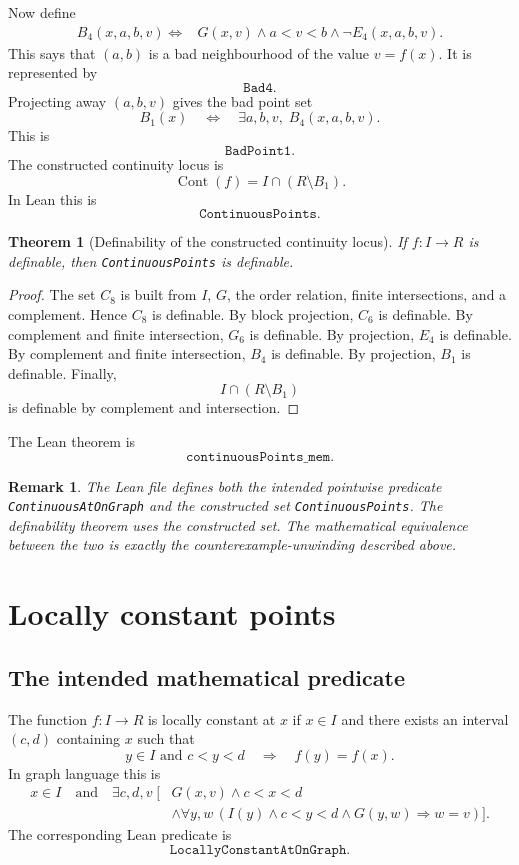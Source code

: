 \documentclass[11pt]{article}
\newtheorem{theorem}[definition]{Theorem}
\newtheorem{remark}[definition]{Remark}
\newcommand{\Cont}{\operatorname{Cont}}
\newcommand{\Lean}[1]{\texttt{#1}}
\begin{document}
Now define
\[
\begin{aligned}
  B_4(x,a,b,v)
  \Longleftrightarrow{}&
  G(x,v)
  \land a<v<b
  \land \neg E_4(x,a,b,v).
\end{aligned}
\]
This says that $(a,b)$ is a bad neighbourhood of the value $v=f(x)$.  It is represented by
\[
  \Lean{Bad4}.
\]
Projecting away $(a,b,v)$ gives the bad point set
\[
  B_1(x)
  \quad\Longleftrightarrow\quad
  \exists a,b,v,
  \;B_4(x,a,b,v).
\]
This is
\[
  \Lean{BadPoint1}.
\]
The constructed continuity locus is
\[
  \Cont(f)=I\cap (R\setminus B_1).
\]
In Lean this is
\[
  \Lean{ContinuousPoints}.
\]

\begin{theorem}[Definability of the constructed continuity locus]
If $f:I\to R$ is definable, then \Lean{ContinuousPoints} is definable.
\end{theorem}

\begin{proof}
The set $C_8$ is built from $I$, $G$, the order relation, finite intersections, and a complement.
Hence $C_8$ is definable.  By block projection, $C_6$ is definable.  By complement and finite
intersection, $G_6$ is definable.  By projection, $E_4$ is definable.  By complement and finite
intersection, $B_4$ is definable.  By projection, $B_1$ is definable.  Finally,
\[
  I\cap(R\setminus B_1)
\]
is definable by complement and intersection.
\end{proof}

The Lean theorem is
\[
  \Lean{continuousPoints\_mem}.
\]

\begin{remark}
The Lean file defines both the intended pointwise predicate \Lean{ContinuousAtOnGraph} and the
constructed set \Lean{ContinuousPoints}.  The definability theorem uses the constructed set.  The
mathematical equivalence between the two is exactly the counterexample-unwinding described above.
\end{remark}

\section{Locally constant points}

\subsection{The intended mathematical predicate}

The function $f:I\to R$ is locally constant at $x$ if $x\in I$ and there exists an interval $(c,d)$
containing $x$ such that
\[
  y\in I\text{ and }c<y<d
  \quad\Longrightarrow\quad
  f(y)=f(x).
\]
In graph language this is
\[
\begin{aligned}
  x\in I
  \quad\text{and}\quad
  \exists c,d,v\;[&G(x,v)
  \land c<x<d\\
  &\land
  \forall y,w\,(I(y)\land c<y<d\land G(y,w)
  \Rightarrow w=v)].
\end{aligned}
\]
The corresponding Lean predicate is
\[
  \Lean{LocallyConstantAtOnGraph}.
\]
\end{document}
